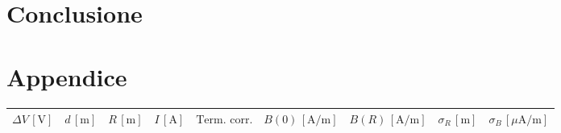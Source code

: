 \documentclass[]{article}
\let\oldsection\section%
\renewcommand{\section}{%
	\renewcommand{\theequation}{\thesection.\arabic{equation}}%
	\oldsection}%
\begin{document}
    \section{Conclusione}

    \newpage
    \section{Appendice}



    \begin{table}[H]
        \centering

    \begin{tabular}{||c|c|c|c|c|c|c|c|c||}
        \hline
        $\Delta V\, [\text{V}] $ & $d\, [\text{m}] $ & $R\, [\text{m}] $ & $I\, [\text{A}] $ & $\text{Term. corr.}$ & $B(0)\, [\text{A/m}] $ & $B(R)\, [\text{A/m}] $ & $ \sigma_R \, [\text{m}] $ & $ \sigma_B \, [\mu\text{A/m}] $ \\
        \hline\hline



\end{tabular}
\end{table}
\end{document}
